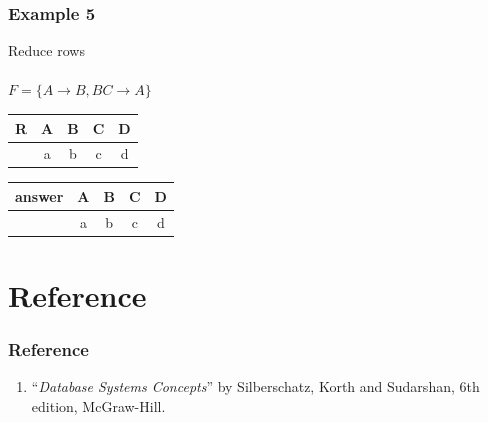 \documentclass{beamer}
\begin{document}
\begin{frame}
  \frametitle{Example 5}
  Reduce rows\\
  \hfill \\
  $F = \{A \rightarrow B, BC \rightarrow A\}$\\
  \begin{tabular}{ c | c c c c}
  R & A & B & C & D\\
  \hline
  &a & b & c  & d \\
  \end{tabular}

  \begin{tabular}{ c | c c c c}
  answer & A & B & C & D\\
  \hline
  & a & b & c  & d \\
  \end{tabular}
\end{frame}

\section{Reference}
\begin{frame}[fragile]
\frametitle{Reference}
\begin{enumerate}
\item ``\textit{Database Systems Concepts}'' by Silberschatz, Korth and Sudarshan,
6th edition, McGraw-Hill.
\end{enumerate}
\end{frame}
\end{document}
